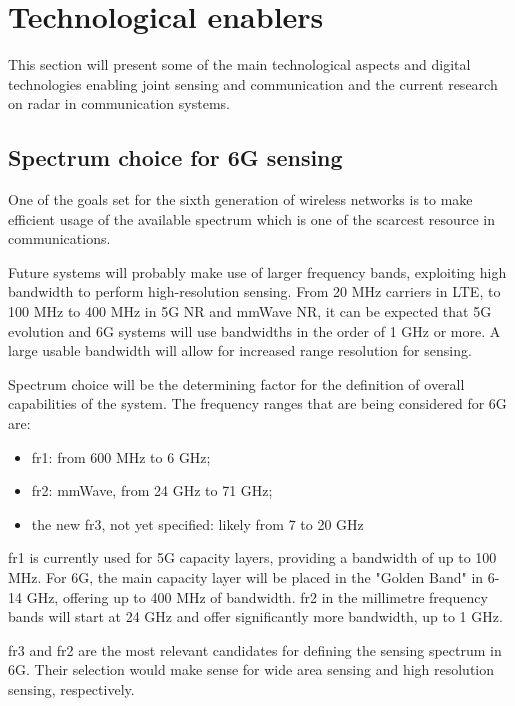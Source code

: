 \section{Technological enablers}

	This section will present some of the main technological aspects and digital technologies enabling joint sensing and communication and the current research on radar in communication systems.	
	
	\subsection{Spectrum choice for 6G sensing}

	One of the goals set for the sixth generation of wireless networks is to make efficient usage of the available spectrum which is one of the scarcest resource in communications.
	
	Future systems will probably make use of larger frequency bands, exploiting high bandwidth to perform high-resolution sensing. From 20 MHz carriers in LTE, to 100 MHz to 400 MHz in 5G NR and mmWave \gls{NR}, it can be expected that \gls{5G} evolution and 6G systems will use bandwidths in the order of 1 GHz or more. A large usable bandwidth will allow for increased range resolution for sensing.
	
	Spectrum choice will be the determining factor for the definition of overall capabilities of the system. The frequency ranges that are being considered for 6G \cite{Hexa} are:
	
	\begin{itemize}
		\item \Gls{fr1}: from 600 MHz to 6 GHz;
		\item \Gls{fr2}: mmWave, from 24 GHz to 71 GHz;
		\item the new \gls{fr3}, not yet specified: likely from 7 to 20 GHz
	\end{itemize}
	
	\Gls{fr1} is currently used for \Gls{5G} capacity layers, providing a bandwidth of up to 100 MHz. For 6G, the main capacity layer will be placed in the "Golden Band" in 6-14 GHz, offering up to 400 MHz of bandwidth. \Gls{fr2} in the millimetre frequency bands will start at 24 GHz and offer significantly more bandwidth, up to 1 GHz.
	
	\Gls{fr3} and \Gls{fr2} are the most relevant candidates for defining the sensing spectrum in 6G. Their selection would make sense for wide area sensing and high resolution sensing, respectively.
	
